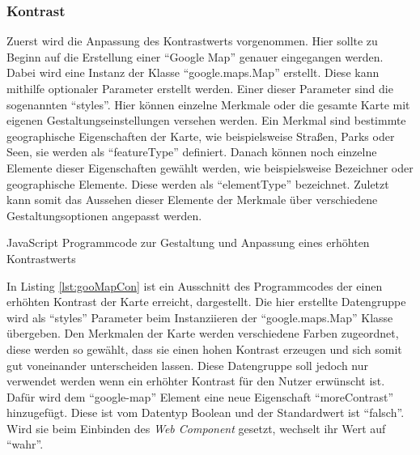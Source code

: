 \documentclass[12pt, paper=a4, bibtotoc, toc=listof, headsepline=true]{scrreprt}
\begin{document}
			\subsubsection{Kontrast}
			Zuerst wird die Anpassung des Kontrastwerts vorgenommen. Hier sollte zu Beginn auf die Erstellung einer \enquote{Google Map} genauer eingegangen werden. Dabei wird eine Instanz der Klasse \enquote{google.maps.Map} erstellt. Diese kann mithilfe optionaler Parameter erstellt werden. Einer dieser Parameter sind die sogenannten \enquote{styles}. Hier können einzelne Merkmale oder die gesamte Karte mit eigenen Gestaltungseinstellungen versehen werden. Ein Merkmal sind bestimmte geographische Eigenschaften der Karte, wie beispielsweise Straßen, Parks oder Seen, sie werden als \enquote{featureType} definiert. Danach können noch einzelne Elemente dieser Eigenschaften gewählt werden, wie beispielsweise Bezeichner oder geographische Elemente. Diese werden als \enquote{elementType} bezeichnet. Zuletzt kann somit das Aussehen dieser Elemente der Merkmale über verschiedene Gestaltungsoptionen angepasst werden\cite{gmapStyle}.
					\begin{listing}
				\caption[Anpassung zur Erhöhung des Kontrastwerts]{JavaScript Programmcode zur Gestaltung und Anpassung eines erhöhten Kontrastwerts}
				\label{lst:gooMapCon}
			\end{listing}
		In Listing \ref{lst:gooMapCon} ist ein Ausschnitt des Programmcodes der einen erhöhten Kontrast der Karte erreicht, dargestellt. Die hier erstellte Datengruppe wird als \enquote{styles} Parameter beim Instanziieren der \enquote{google.maps.Map} Klasse übergeben. Den Merkmalen der Karte werden verschiedene Farben zugeordnet, diese werden so gewählt, dass sie einen hohen Kontrast erzeugen und sich somit gut voneinander unterscheiden lassen. Diese Datengruppe soll jedoch nur verwendet werden wenn ein erhöhter Kontrast für den Nutzer erwünscht ist. Dafür wird dem \enquote{google-map} Element eine neue Eigenschaft \enquote{moreContrast} hinzugefügt. Diese ist vom Datentyp Boolean und der Standardwert ist \enquote{falsch}. Wird sie beim Einbinden des \emph{Web Component} gesetzt, wechselt ihr Wert auf \enquote{wahr}. 
\end{document}
